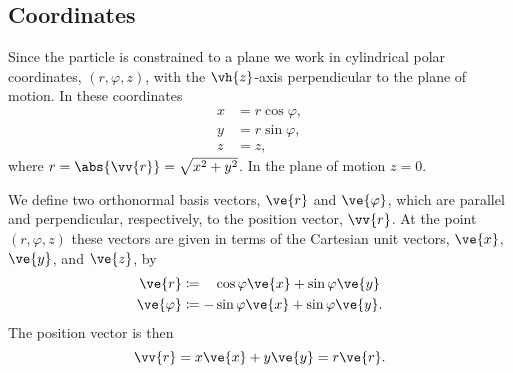 \documentclass[fleqn]{NotesClass}
\begin{document}
    \subsection{Coordinates}
    Since the particle is constrained to a plane we work in cylindrical polar coordinates, \((r, \varphi, z)\), with the \(\vh{z}\)-axis perpendicular to the plane of motion.
    In these coordinates
    \begin{align}
        x &= r\cos\varphi,\\
        y &= r\sin\varphi,\\
        z &= z,
    \end{align}
    where \(r = \abs{\vv{r}} = \sqrt{x^2 + y^2}\).
    In the plane of motion \(z = 0\).
    
    We define two orthonormal basis vectors, \(\ve{r}\) and \(\ve{\varphi}\), which are parallel and perpendicular, respectively, to the position vector, \(\vv{r}\).
    At the point \((r, \varphi, z)\) these vectors are given in terms of the Cartesian unit vectors, \(\ve{x}\), \(\ve{y}\), and \(\ve{z}\), by
    \begin{align}
        \ve{r} &\coloneqq \hphantom{-}\cos\varphi\ve{x} + \sin\varphi\ve{y}\label{eqn:e_r definition}\\
        \ve{\varphi} &\coloneqq -\sin\varphi\ve{x} + \sin\varphi\ve{y}.
    \end{align}
    The position vector is then
    \begin{equation}
        \vv{r} = x\ve{x} + y\ve{y} = r\ve{r}.
    \end{equation}
    
\end{document}

